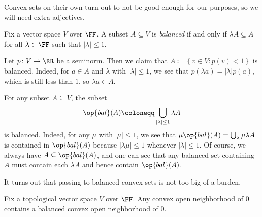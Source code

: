 \documentclass[notes.tex]{subfiles}
\begin{document}
Convex sets on their own turn out to not be good enough for our purposes, so we will need extra adjectives.
\begin{definition}[balanced]
	Fix a vector space $V$ over $\FF$. A subset $A\subseteq V$ is \textit{balanced} if and only if $\lambda A\subseteq A$ for all $\lambda\in\FF$ such that $\left|\lambda\right|\le1$.
\end{definition}
\begin{example} \label{ex:seminorm-to-balanced}
	Let $p\colon V\to\RR$ be a seminorm. Then we claim that $A\coloneqq\left\{v\in V:p(v)<1\right\}$ is balanced. Indeed, for $a\in A$ and $\lambda$ with $\left|\lambda\right|\le1$, we see that $p(\lambda a)=\left|\lambda\right|p(a)$, which is still less than $1$, so $\lambda a\in A$.
\end{example}
\begin{example} \label{ex:balanced-hull}
	For any subset $A\subseteq V$, the subset
	\[\op{bal}(A)\coloneqq\bigcup_{\left|\lambda\right|\le1}\lambda A\]
	is balanced. Indeed, for any $\mu$ with $\left|\mu\right|\le1$, we see that $\mu\op{bal}(A)=\bigcup_\lambda\mu\lambda A$ is contained in $\op{bal}(A)$ because $\left|\lambda\mu\right|\le1$ whenever $\left|\lambda\right|\le1$. Of course, we always have $A\subseteq\op{bal}(A)$, and one can see that any balanced set containing $A$ must contain each $\lambda A$ and hence contain $\op{bal}(A)$.
\end{example}
It turns out that passing to balanced convex sets is not too big of a burden.
\begin{lemma} \label{lem:convex-to-convex-balanced}
	Fix a topological vector space $V$ over $\FF$. Any convex open neighborhood of $0$ contains a balanced convex open neighborhood of $0$.
\end{lemma}
\end{document}
